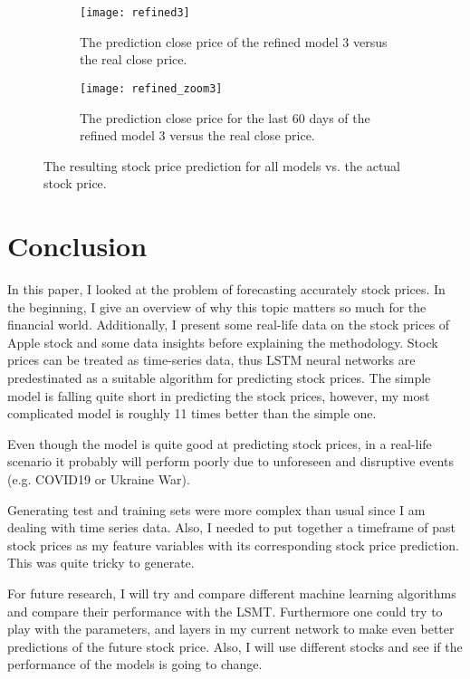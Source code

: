 \documentclass[fleqn,10pt]{SelfArx} %
\begin{document}
\begin{figure*}[htb]
\medskip
\begin{subfigure}{0.85\columnwidth}
	\texttt{[image: refined3]}
	\caption{The prediction close price of the refined model 3 versus the real close price.}
	\label{fig:refined3}
	\end{subfigure}\hfil%
\begin{subfigure}{0.85\columnwidth}
	\texttt{[image: refined\_zoom3]}
	\caption{The prediction close price for the last 60 days of the refined model 3 versus the real close price.}
	\label{fig:refined_zoom3}
	\end{subfigure}
	\label{fig.results}
	\caption{The resulting stock price prediction for all models vs. the actual stock price.}
\end{figure*}



\section{Conclusion}
In this paper, I looked at the problem of forecasting accurately stock prices. In the beginning, I give an overview of why this topic matters so much for the financial world. Additionally, I present some real-life data on the stock prices of Apple stock and some data insights before explaining the methodology. Stock prices can be treated as time-series data, thus LSTM neural networks are predestinated as a suitable algorithm for predicting stock prices. The simple model is falling quite short in predicting the stock prices, however, my most complicated model is roughly 11 times better than the simple one. 

Even though the model is quite good at predicting stock prices, in a real-life scenario it probably will perform poorly due to unforeseen and disruptive events (e.g. COVID19 or Ukraine War).


Generating test and training sets were more complex than usual since I am dealing with time series data. Also, I needed to put together a timeframe of past stock prices as my feature variables with its corresponding stock price prediction. This was quite tricky to generate.


For future research, I will try and compare different machine learning algorithms and compare their performance with the LSMT. Furthermore one could try to play with the parameters, and layers in my current network to make even better predictions of the future stock price. Also, I will use different stocks and see if the performance of the models is going to change.
\end{document}
